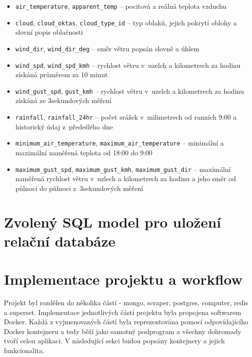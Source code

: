 \documentclass[10pt,a4paper,titlepage]{extarticle}
\begin{document}
\begin{itemize}
\begin{itemize}[label=\textperiodcentered]
        \item \texttt{air\_temperature}, \texttt{apparent\_temp} -- pocitová a reálná teplota vzduchu
        \item \texttt{cloud}, \texttt{cloud\_oktas}, \texttt{cloud\_type\_id} -- typ oblaků, jejich pokrytí oblohy a slovní popis oblačnosti
        \item \texttt{wind\_dir}, \texttt{wind\_dir\_deg} -- směr větru popsán slovně a úhlem 
        \item \texttt{wind\_spd}, \texttt{wind\_spd\_kmh} -- rychlost větru v~uzelch a kilometrech za hodinu získáná průměrem za 10 minut
        \item \texttt{wind\_gust\_spd}, \texttt{gust\_kmh} -- rychlost větru v~uzelch a kilometrech za hodinu získáná
        ze 3sekundových měření
        \item \texttt{rainfall}, \texttt{rainfall\_24hr} -- počet srážek v~milimetrech od ranních 9:00 a historický
        údaj z~předešlého dne
        \item \texttt{minimum\_air\_temperature}, \texttt{maximum\_air\_temperature} -- minimální a maximální naměřená teplota od 18:00 do 9:00
        \item \texttt{maximum\_gust\_spd}, \texttt{maximum\_gust\_kmh}, \texttt{maximum\_gust\_dir} -- maximální
        naměřená rychlost větru v~uzlech a kilometrech za hodinu a jeho směr od půlnoci do půlnoci z~3sekundových měření
    \end{itemize}
\end{itemize}


\section{Zvolený SQL model pro uložení relační databáze}


\section{Implementace projektu a workflow}

Projekt byl rozdělen do několika částí - mongo, scraper, postgres, computer, redis a superset. Implementace jednotlivých částí projektu byla propojena softwarem Docker. Každá z vyjmenovaných částí byla reprezentována pomocí odpovídajícího Docker kontejneru a tedy běží jako samotný podprogram a všechny dohromady tvoří celou aplikaci. V následující sekci budou popsány kontejnery a jejich funkcionalita.
\end{document}
